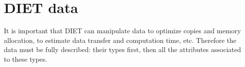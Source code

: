 
\chapter{DIET data}
\label{ch:data}

It is important that DIET can manipulate data to optimize copies and memory
allocation, to estimate data transfer and computation time, etc.  Therefore the
data must be fully described: their types first, then all the attributes
associated to these types.



